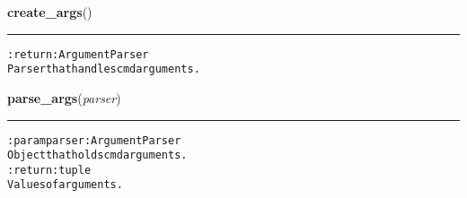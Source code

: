     \vspace{0.5ex}

\hspace{.8\funcindent}\begin{boxedminipage}{\funcwidth}

    \raggedright \textbf{create\_args}()

    \vspace{-1.5ex}

    \rule{\textwidth}{0.5\fboxrule}
\setlength{\parskip}{2ex}
\begin{alltt}

:return: ArgumentParser
    Parser that handles cmd arguments.
\end{alltt}

\setlength{\parskip}{1ex}
    \end{boxedminipage}

    \label{pygce:cli:parse_args}

    \vspace{0.5ex}

\hspace{.8\funcindent}\begin{boxedminipage}{\funcwidth}

    \raggedright \textbf{parse\_args}(\textit{parser})

    \vspace{-1.5ex}

    \rule{\textwidth}{0.5\fboxrule}
\setlength{\parskip}{2ex}
\begin{alltt}

:param parser: ArgumentParser
    Object that holds cmd arguments.
:return: tuple
    Values of arguments.
\end{alltt}

\setlength{\parskip}{1ex}
    \end{boxedminipage}

    \label{pygce:cli:check_args}

    \vspace{0.5ex}

